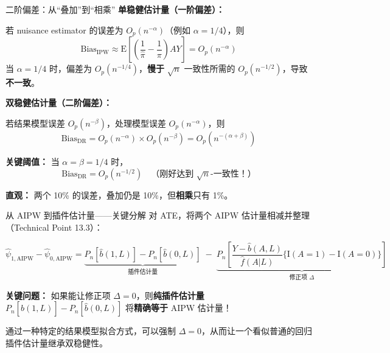 \documentclass[aspectratio=169,10pt]{beamer}
\newcommand{\E}{\mathrm{E}}
\begin{document}
	\begin{frame}{二阶偏差：从“叠加”到“相乘”}
		\textbf{单稳健估计量（一阶偏差）：}
		
		若 nuisance estimator 的误差为 $O_p(n^{-\alpha})$（例如 $\alpha=1/4$），则
		\[
		\text{Bias}_{\text{IPW}} \approx \E\left[\left(\frac{1}{\widehat{\pi}} - \frac{1}{\pi}\right) AY\right] = O_p(n^{-\alpha})
		\]
		当 $\alpha=1/4$ 时，偏差为 $O_p(n^{-1/4})$，\textbf{慢于} $\sqrt{n}$ 一致性所需的 $O_p(n^{-1/2})$，导致\textbf{不一致}。
		
		\vspace{0.3cm}
		\textbf{双稳健估计量（二阶偏差）：}
		
		若结果模型误差 $O_p(n^{-\beta})$，处理模型误差 $O_p(n^{-\alpha})$，则
		\[
		\text{Bias}_{\text{DR}} = O_p(n^{-\alpha}) \times O_p(n^{-\beta}) = O_p(n^{-(\alpha+\beta)})
		\]
		
		\textbf{关键阈值：} 当 $\alpha = \beta = 1/4$ 时，
		\[
		\text{Bias}_{\text{DR}} = O_p(n^{-1/2}) \quad \text{（刚好达到 $\sqrt{n}$-一致性！）}
		\]
		
		\textbf{直观：} 两个 10\% 的误差，叠加仍是 10\%，但\textbf{相乘}只有 1\%。
	\end{frame}
	
	\begin{frame}{从 AIPW 到插件估计量——关键分解}
		对 ATE，将两个 AIPW 估计量相减并整理（Technical Point 13.3）：
		
		\[
		\widehat{\psi}_{1,\text{AIPW}} - \widehat{\psi}_{0,\text{AIPW}} = \underbrace{P_n[\widehat{b}(1,L)] - P_n[\widehat{b}(0,L)]}_{\text{插件估计量}} \;-\; \underbrace{P_n\!\left[\frac{Y - \widehat{b}(A,L)}{\widehat{f}(A|L)}\big\{\mathrm{I}(A=1) - \mathrm{I}(A=0)\big\}\right]}_{\text{修正项 } \Delta}
		\]
		
		\textbf{关键问题：} 如果能让修正项 $\Delta = 0$，则\textbf{纯插件估计量} $P_n[\widehat{b}(1,L)] - P_n[\widehat{b}(0,L)]$ 将\textbf{精确等于} AIPW 估计量！
		
		\vspace{0.3cm}
		 通过一种特定的结果模型拟合方式，可以强制 $\Delta = 0$，从而让一个看似普通的回归插件估计量继承双稳健性。
	\end{frame}
	
\end{document}
